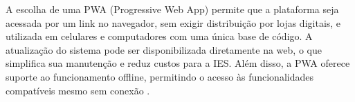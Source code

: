 A escolha de uma PWA (Progressive Web App) permite que a plataforma seja acessada por um link no navegador, sem exigir distribuição por lojas digitais, e utilizada em celulares e computadores com uma única base de código. A atualização do sistema pode ser disponibilizada diretamente na web, o que simplifica sua manutenção e reduz custos para a IES. Além disso, a PWA oferece suporte ao funcionamento offline, permitindo o acesso às funcionalidades compatíveis mesmo sem conexão \cite{fortunato2018pwa}.



